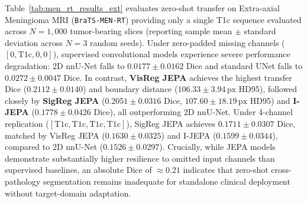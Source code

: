 \documentclass{article}
\begin{document}
Table~\ref{tab:men_rt_results_ext} evaluates zero-shot transfer on Extra-axial Meningioma MRI (\texttt{BraTS-MEN-RT}) providing only a single T1c sequence evaluated across $N=1,000$ tumor-bearing slices (reporting sample mean $\pm$ standard deviation across $N=3$ random seeds). Under zero-padded missing channels ($[0, \text{T1c}, 0, 0]$), supervised convolutional models experience severe performance degradation: 2D nnU-Net falls to $0.0177 \pm 0.0162$ Dice and standard UNet falls to $0.0272 \pm 0.0047$ Dice. In contrast, \textbf{VisReg JEPA} achieves the highest transfer Dice ($0.2112 \pm 0.0140$) and boundary distance ($106.33 \pm 3.94\,\text{px}$ HD95), followed closely by \textbf{SigReg JEPA} ($0.2051 \pm 0.0316$ Dice, $107.60 \pm 18.19\,\text{px}$ HD95) and \textbf{I-JEPA} ($0.1778 \pm 0.0426$ Dice), all outperforming 2D nnU-Net. Under 4-channel replication ($[\text{T1c}, \text{T1c}, \text{T1c}, \text{T1c}]$), SigReg JEPA achieves $0.1711 \pm 0.0307$ Dice, matched by VisReg JEPA ($0.1630 \pm 0.0325$) and I-JEPA ($0.1599 \pm 0.0344$), compared to 2D nnU-Net ($0.1526 \pm 0.0297$). Crucially, while JEPA models demonstrate substantially higher resilience to omitted input channels than supervised baselines, an absolute Dice of $\approx 0.21$ indicates that zero-shot cross-pathology segmentation remains inadequate for standalone clinical deployment without target-domain adaptation.
\end{document}
